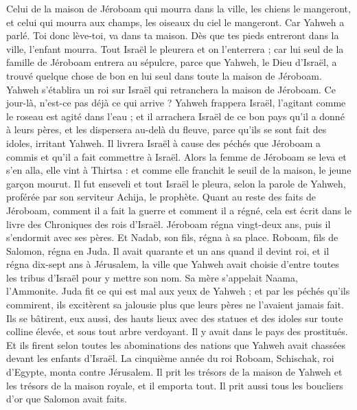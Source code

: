 \begin{multicols}{2}
Celui de la maison de Jéroboam qui mourra dans la ville, les chiens le mangeront, et celui qui mourra aux champs, les oiseaux du ciel le mangeront. Car Yahweh a parlé.
Toi donc lève-toi, va dans ta maison. Dès que tes pieds entreront dans la ville, l'enfant mourra.
Tout Israël le pleurera et on l’enterrera ; car lui seul de la famille de Jéroboam entrera au sépulcre, parce que Yahweh, le Dieu d'Israël, a trouvé quelque chose de bon en lui seul dans toute la maison de Jéroboam.
Yahweh s'établira un roi sur Israël qui retranchera la maison de Jéroboam. Ce jour-là, n’est-ce pas déjà ce qui arrive ?
Yahweh frappera Israël, l'agitant comme le roseau est agité dans l'eau ; et il arrachera Israël de ce bon pays qu'il a donné à leurs pères, et les dispersera au-delà du fleuve, parce qu'ils se sont fait des idoles, irritant Yahweh.
Il livrera Israël à cause des péchés que Jéroboam a commis et qu’il a fait commettre à Israël.
Alors la femme de Jéroboam se leva et s'en alla, elle vint à Thirtsa : et comme elle franchit le seuil de la maison, le jeune garçon mourut.
Il fut enseveli et tout Israël le pleura, selon la parole de Yahweh, proférée par son serviteur Achija, le prophète.
Quant au reste des faits de Jéroboam, comment il a fait la guerre et comment il a régné, cela est écrit dans le livre des Chroniques des rois d'Israël.
Jéroboam régna vingt-deux ans, puis il s'endormit avec ses pères. Et Nadab, son fils, régna à sa place.
Roboam, fils de Salomon, régna en Juda. Il avait quarante et un ans quand il devint roi, et il régna dix-sept ans à Jérusalem, la ville que Yahweh avait choisie d'entre toutes les tribus d'Israël pour y mettre son nom. Sa mère s’appelait Naama, l’Ammonite.
Juda fit ce qui est mal aux yeux de Yahweh ; et par les péchés qu'ils commirent, ils excitèrent sa jalousie plus que leurs pères ne l'avaient jamais fait.
Ils se bâtirent, eux aussi, des hauts lieux avec des statues et des idoles sur toute colline élevée, et sous tout arbre verdoyant.
Il y avait dans le pays des prostitués. Et ils firent selon toutes les abominations des nations que Yahweh avait chassées devant les enfants d'Israël.
La cinquième année du roi Roboam, Schischak, roi d'Egypte, monta contre Jérusalem.
Il prit les trésors de la maison de Yahweh et les trésors de la maison royale, et il emporta tout. Il prit aussi tous les boucliers d'or que Salomon avait faits.

\end{multicols}

